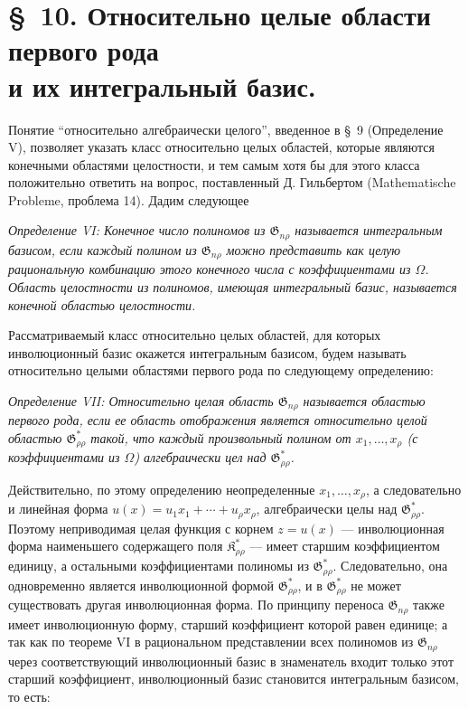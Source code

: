 \documentclass[11pt]{article}
\providecommand{\Kfield}{\mathfrak{K}}
\providecommand{\Gdom}{\mathfrak{G}}
\begin{document}
\section*{\S\ 10. Относительно целые области первого рода\\ и их интегральный базис.}

Понятие ``относительно алгебраически целого'', введенное в \S\ 9 (Определение V), позволяет указать класс относительно целых областей, которые являются конечными областями целостности, и тем самым хотя бы для этого класса положительно ответить на вопрос, поставленный Д. Гильбертом (Mathematische Probleme, проблема 14). Дадим следующее

\emph{Определение VI: Конечное число полиномов из $\Gdom_{n\rho}$ называется интегральным базисом, если каждый полином из $\Gdom_{n\rho}$ можно представить как целую рациональную комбинацию этого конечного числа с коэффициентами из $\Omega$. Область целостности из полиномов, имеющая интегральный базис, называется конечной областью целостности.}

Рассматриваемый класс относительно целых областей, для которых инволюционный базис окажется интегральным базисом, будем называть относительно целыми областями первого рода по следующему определению:

\emph{Определение VII: Относительно целая область $\Gdom_{n\rho}$ называется областью первого рода, если ее область отображения является относительно целой областью $\Gdom^*_{\rho\rho}$ такой, что каждый произвольный полином от $x_1,\ldots,x_\rho$ (с коэффициентами из $\Omega$) алгебраически цел над $\Gdom^*_{\rho\rho}$.}

Действительно, по этому определению неопределенные $x_1,\ldots,x_\rho$, а следовательно и линейная форма $u(x)=u_1x_1+\cdots+u_\rho x_\rho$, алгебраически целы над $\Gdom^*_{\rho\rho}$. Поэтому неприводимая целая функция с корнем $z=u(x)$ --- инволюционная форма наименьшего содержащего поля $\Kfield^*_{\rho\rho}$ --- имеет старшим коэффициентом единицу, а остальными коэффициентами полиномы из $\Gdom^*_{\rho\rho}$. Следовательно, она одновременно является инволюционной формой $\Gdom^*_{\rho\rho}$, и в $\Gdom^*_{\rho\rho}$ не может существовать другая инволюционная форма. По принципу переноса $\Gdom_{n\rho}$ также имеет инволюционную форму, старший коэффициент которой равен единице; а так как по теореме VI в рациональном представлении всех полиномов из $\Gdom_{n\rho}$ через соответствующий инволюционный базис в знаменатель входит только этот старший коэффициент, инволюционный базис становится интегральным базисом, то есть:
\end{document}
